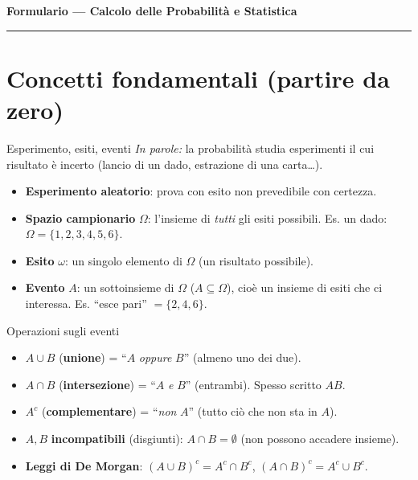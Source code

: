 \documentclass[11pt]{article}
\newcommand{\inparole}[1]{\emph{In parole:} #1}
\begin{document}
\begin{center}
{\LARGE\bfseries Formulario --- Calcolo delle Probabilit\`a e Statistica}
\end{center}
\vspace{2pt}\hrule\vspace{6pt}

\renewcommand{\contentsname}{\large Indice}
{\setlength{\parskip}{2pt}\tableofcontents}

\newpage
\setcounter{section}{-1}
\section{Concetti fondamentali (partire da zero)}

\begin{concetto}[barSlate]{Esperimento, esiti, eventi}
\inparole{la probabilit\`a studia esperimenti il cui risultato \`e incerto (lancio di un dado, estrazione di una carta\dots).}
\begin{itemize}[leftmargin=1.2em,itemsep=2pt,topsep=2pt]
\item \textbf{Esperimento aleatorio}: prova con esito non prevedibile con certezza.
\item \textbf{Spazio campionario} $\Omega$: l'insieme di \emph{tutti} gli esiti possibili. Es. un dado: $\Omega=\{1,2,3,4,5,6\}$.
\item \textbf{Esito} $\omega$: un singolo elemento di $\Omega$ (un risultato possibile).
\item \textbf{Evento} $A$: un sottoinsieme di $\Omega$ ($A \subseteq \Omega$), cio\`e un insieme di esiti che ci interessa. Es. ``esce pari'' $= \{2,4,6\}$.
\end{itemize}
\end{concetto}

\begin{concetto}[barSlate]{Operazioni sugli eventi}
\begin{itemize}[leftmargin=1.2em,itemsep=2pt,topsep=2pt]
\item $A \cup B$ (\textbf{unione}) = ``$A$ \emph{oppure} $B$'' (almeno uno dei due).
\item $A \cap B$ (\textbf{intersezione}) = ``$A$ \emph{e} $B$'' (entrambi). Spesso scritto $AB$.
\item $A^c$ (\textbf{complementare}) = ``\emph{non} $A$'' (tutto ci\`o che non sta in $A$).
\item $A, B$ \textbf{incompatibili} (disgiunti): $A \cap B = \emptyset$ (non possono accadere insieme).
\item \textbf{Leggi di De Morgan}: $(A \cup B)^c = A^c \cap B^c$, \quad $(A \cap B)^c = A^c \cup B^c$.
\end{itemize}
\end{concetto}
\end{document}
